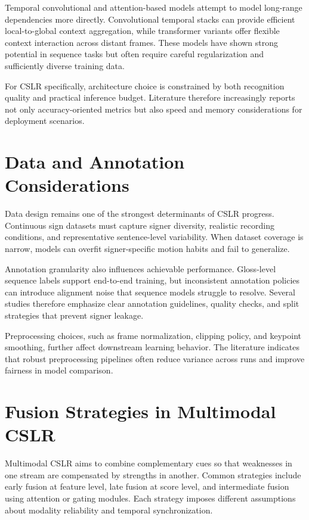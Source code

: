 Temporal convolutional and attention-based models attempt to model long-range dependencies more directly. Convolutional temporal stacks can provide efficient local-to-global context aggregation, while transformer variants offer flexible context interaction across distant frames. These models have shown strong potential in sequence tasks but often require careful regularization and sufficiently diverse training data.

For CSLR specifically, architecture choice is constrained by both recognition quality and practical inference budget. Literature therefore increasingly reports not only accuracy-oriented metrics but also speed and memory considerations for deployment scenarios.

\section{Data and Annotation Considerations}

Data design remains one of the strongest determinants of CSLR progress. Continuous sign datasets must capture signer diversity, realistic recording conditions, and representative sentence-level variability. When dataset coverage is narrow, models can overfit signer-specific motion habits and fail to generalize.

Annotation granularity also influences achievable performance. Gloss-level sequence labels support end-to-end training, but inconsistent annotation policies can introduce alignment noise that sequence models struggle to resolve. Several studies therefore emphasize clear annotation guidelines, quality checks, and split strategies that prevent signer leakage.

Preprocessing choices, such as frame normalization, clipping policy, and keypoint smoothing, further affect downstream learning behavior. The literature indicates that robust preprocessing pipelines often reduce variance across runs and improve fairness in model comparison.

\section{Fusion Strategies in Multimodal CSLR}

Multimodal CSLR aims to combine complementary cues so that weaknesses in one stream are compensated by strengths in another. Common strategies include early fusion at feature level, late fusion at score level, and intermediate fusion using attention or gating modules. Each strategy imposes different assumptions about modality reliability and temporal synchronization.

